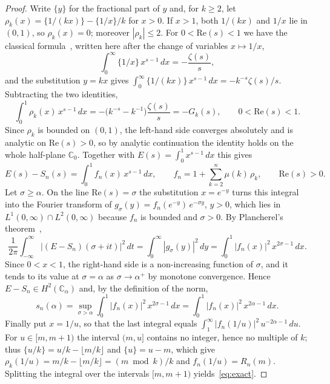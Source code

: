 \documentclass[11pt]{extarticle}
\numberwithin{equation}{section}
\theoremstyle{plain}
\theoremstyle{remark}
\begin{document}
\begin{proof}
Write $\{y\}$ for the fractional part of $y$ and, for $k \geq 2$, let
$\rho_k(x) = \{1/(kx)\} - \{1/x\}/k$ for $x > 0$. If $x > 1$, both $1/(kx)$ and $1/x$
lie in $(0,1)$, so $\rho_k(x) = 0$; moreover $|\rho_k| \leq 2$. For
$0 < \mathrm{Re}(s) < 1$ we have the classical formula~\cite[\S2.1]{titchmarsh},
written here after the change of variables $x \mapsto 1/x$,
\[
\int_0^\infty \{1/x\}\, x^{s-1}\, dx = -\frac{\zeta(s)}{s},
\]
and the substitution $y = kx$ gives
$\int_0^\infty \{1/(kx)\}\, x^{s-1}\,dx = -k^{-s}\zeta(s)/s$. Subtracting the two
identities,
\[
\int_0^1 \rho_k(x)\, x^{s-1}\, dx = -\bigl(k^{-s} - k^{-1}\bigr)\frac{\zeta(s)}{s} = -G_k(s),
\qquad 0 < \mathrm{Re}(s) < 1 .
\]
Since $\rho_k$ is bounded on $(0,1)$, the left-hand side converges absolutely and is
analytic on $\mathrm{Re}(s) > 0$, so by analytic continuation the identity holds on the
whole half-plane $\mathbb{C}_0$. Together with $E(s) = \int_0^1 x^{s-1}\,dx$ this gives
\[
E(s) - S_n(s) = \int_0^1 f_n(x)\, x^{s-1}\, dx,
\qquad f_n = 1 + \sum_{k=2}^{n} \mu(k)\,\rho_k,
\qquad \mathrm{Re}(s) > 0 .
\]
Let $\sigma \geq \alpha$. On the line $\mathrm{Re}(s) = \sigma$ the substitution
$x = e^{-y}$ turns this integral into the Fourier transform of
$g_\sigma(y) = f_n(e^{-y})\,e^{-\sigma y}$, $y > 0$, which lies in
$L^1(0,\infty) \cap L^2(0,\infty)$ because $f_n$ is bounded and $\sigma > 0$. By
Plancherel's theorem~\cite[Theorem~9.13]{rudin},
\[
\frac{1}{2\pi}\int_{-\infty}^{\infty} \bigl|(E - S_n)(\sigma+it)\bigr|^2\,dt
= \int_0^\infty |g_\sigma(y)|^2\,dy
= \int_0^1 |f_n(x)|^2\, x^{2\sigma-1}\,dx .
\]
Since $0 < x < 1$, the right-hand side is a non-increasing function of $\sigma$, and it
tends to its value at $\sigma = \alpha$ as $\sigma \to \alpha^+$ by monotone convergence.
Hence $E - S_n \in H^2(\mathbb{C}_\alpha)$ and, by the definition of the norm,
\[
s_n(\alpha) = \sup_{\sigma > \alpha} \int_0^1 |f_n(x)|^2\, x^{2\sigma-1}\,dx
= \int_0^1 |f_n(x)|^2\, x^{2\alpha-1}\,dx .
\]
Finally put $x = 1/u$, so that the last integral equals
$\int_1^\infty |f_n(1/u)|^2\, u^{-2\alpha-1}\,du$. For $u \in [m, m+1)$ the interval
$(m, u]$ contains no integer, hence no multiple of $k$; thus
$\{u/k\} = u/k - \lfloor m/k \rfloor$ and $\{u\} = u - m$, which give
$\rho_k(1/u) = m/k - \lfloor m/k \rfloor = (m \bmod k)/k$ and $f_n(1/u) = R_n(m)$.
Splitting the integral over the intervals $[m, m+1)$ yields~\eqref{eq:exact}.
\end{proof}
\end{document}
